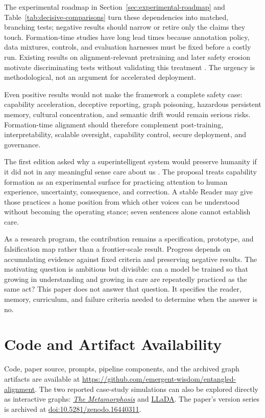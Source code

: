The experimental roadmap in Section~\ref{sec:experimental-roadmap} and
Table~\ref{tab:decisive-comparisons} turn these dependencies into matched,
branching tests; negative results should narrow or retire only the claims they
touch. Formation-time studies have long lead times because annotation policy,
data mixtures, controls, and evaluation harnesses must be fixed before a costly
run. Existing results on alignment-relevant pretraining and later safety erosion
motivate discriminating tests without validating this treatment
\cite{betley2025alignment,qi2024safety}. The urgency is methodological, not an
argument for accelerated deployment.

Even positive results would not make the framework a complete safety case:
capability acceleration, deceptive reporting, graph poisoning, hazardous
persistent memory, cultural concentration, and semantic drift would remain
serious risks.
Formation-time alignment should therefore complement post-training,
interpretability, scalable oversight, capability control, secure deployment,
and governance.

The first edition asked why a superintelligent system would preserve humanity
if it did not in any meaningful sense care about us
\cite{westerberg2025superintelligence}. The proposal treats capability
formation as an experimental surface for practicing attention to human
experience, uncertainty, consequence, and correction. A stable Reader may give
those practices a home position from which other voices can be understood
without becoming the operating stance; seven sentences alone cannot establish
care.

As a research program, the contribution remains a specification, prototype, and
falsification map rather than a frontier-scale result. Progress depends on accumulating
evidence against fixed criteria and preserving negative results. The motivating
question is ambitious but divisible:
can a model be trained so that
growing in understanding and growing in care are repeatedly practiced as the
same act? This paper does not answer that question. It specifies the reader,
memory, curriculum, and failure criteria needed to determine when the answer is
no.

	\section*{Code and Artifact Availability}

	Code, paper source, prompts, pipeline components, and the archived graph artifacts are available at \url{https://github.com/emergent-wisdom/entangled-alignment}. The two reported case-study simulations can also be explored directly as interactive graphs: \href{https://emergentwisdom.org/entangled-alignment/?project=metamorphosis}{\emph{The Metamorphosis}} and \href{https://emergentwisdom.org/entangled-alignment/?project=llada}{LLaDA}. The paper's version series is archived at \href{https://doi.org/10.5281/zenodo.16440311}{doi:10.5281/zenodo.16440311}.

	\begingroup
	\footnotesize
	
	
	\endgroup
	

